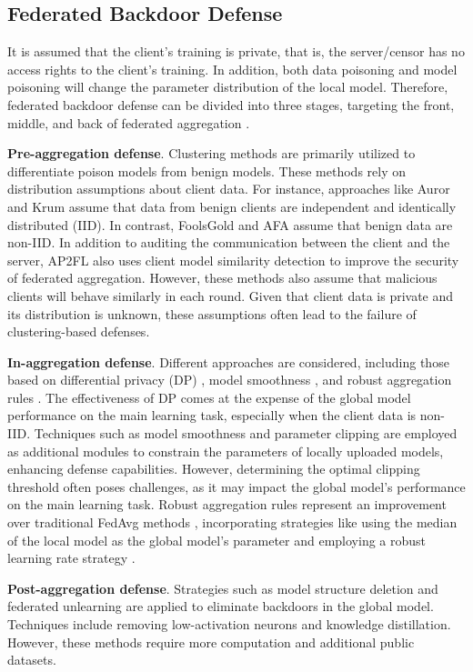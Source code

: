 \subsection{Federated Backdoor Defense}\label{Sec2.3}

It is assumed that the client's training is private, that is, the server/censor has no access rights to the client's training. In addition, both data poisoning and model poisoning will change the parameter distribution of the local model. Therefore, federated backdoor defense can be divided into three stages, targeting the front, middle, and back of federated aggregation \cite{R16}.

\textbf{Pre-aggregation defense}. Clustering methods are primarily utilized to differentiate poison models from benign models. These methods rely on distribution assumptions about client data. For instance, approaches like Auror \cite{R17} and Krum \cite{R18} assume that data from benign clients are independent and identically distributed (IID). In contrast, FoolsGold \cite{R19} and AFA \cite{R20} assume that benign data are non-IID. In addition to auditing the communication between the client and the server, AP2FL \cite{R52} also uses client model similarity detection to improve the security of federated aggregation. However, these methods also assume that malicious clients will behave similarly in each round. Given that client data is private and its distribution is unknown, these assumptions often lead to the failure of clustering-based defenses.

\textbf{In-aggregation defense}. Different approaches are considered, including those based on differential privacy (DP) \cite{R23}, model smoothness \cite{R25}, and robust aggregation rules \cite{R26}. The effectiveness of DP comes at the expense of the global model performance on the main learning task, especially when the client data is non-IID. Techniques such as model smoothness and parameter clipping are employed as additional modules to constrain the parameters of locally uploaded models, enhancing defense capabilities. However, determining the optimal clipping threshold often poses challenges, as it may impact the global model's performance on the main learning task. Robust aggregation rules represent an improvement over traditional FedAvg methods \cite{R1}, incorporating strategies like using the median of the local model as the global model's parameter \cite{R27} and employing a robust learning rate strategy \cite{R26}.

\textbf{Post-aggregation defense}. Strategies such as model structure deletion \cite{R28} and federated unlearning \cite{R42} are applied to eliminate backdoors in the global model. Techniques include removing low-activation neurons and knowledge distillation. However, these methods require more computation and additional public datasets.